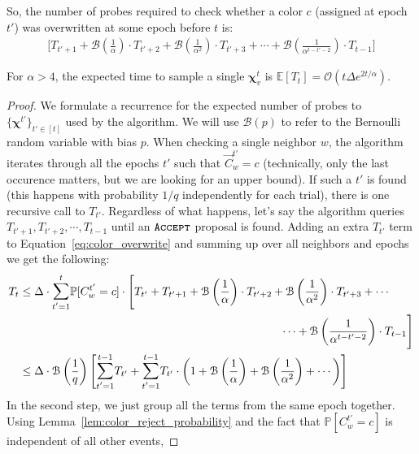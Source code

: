 So, the number of probes required to check whether a color $c$ (assigned at epoch $t'$) was overwritten at some epoch before $t$ is:
\begin{align}
\label{eq:color_overwrite}
\Biggl[T_{t'+1} + \mathcal B\left(\frac{1}{\alpha}\right)\cdot T_{t'+2}
+ \mathcal B\left(\frac{1}{\alpha^2}\right)\cdot T_{t'+3} + \cdots
+ \mathcal B\left(\frac{1}{\alpha^{t-t'-2}}\right)\cdot T_{t-1} \Biggr]
\end{align}

\begin{lemma}
\label{lem:coloring_recurrence}
For $\alpha>4$, the expected time to sample a single $\bm\chi^t_v$ is $\mathbb E[T_t] = \mathcal{O}\left(t\Delta e^{2t/\alpha}\right)$.
\end{lemma}
\begin{proof}
We formulate a recurrence for the expected number of probes to $\{\bm\chi^{t'}\}_{t'\in[t]}$ used by the algorithm.
We will use $\mathcal B(p)$ to refer to the Bernoulli random variable with bias $p$.
When checking a single neighbor $w$, the algorithm iterates through all the epochs $t'$ such that $\vec C^{t'}_w = c$
(technically, only the last occurence matters, but we are looking for an upper bound).
If such a $t'$ is found (this happens with probability $1/q$ independently for each trial), there is one recursive call to $T_{t'}$.
Regardless of what happens, let's say the algorithm queries $T_{t'+1}, T_{t'+2}, \cdots, T_{t-1}$ until an $\texttt{\textsc{Accept}}$ proposal is found.
Adding an extra $T_{t'}$ term to Equation~\ref{eq:color_overwrite} and summing up over all neighbors and epochs we get the following:
\begin{align}
T_{t} &\le \Delta \cdot \mathlarger\sum\limits_{t'=1}^{t} \mathbb P[C^{t'}_w = c]\cdot
\Biggl[ T_{t'} + T_{t'+1} + \mathcal B\left(\frac{1}{\alpha}\right)\cdot T_{t'+2}
+ \mathcal B\left(\frac{1}{\alpha^2}\right)\cdot T_{t'+3} + \cdots\\
&\hspace{23em}
\cdots + \mathcal B\left(\frac{1}{\alpha^{t-t'-2}}\right)\cdot T_{t-1} \Biggr]\\
&\le \Delta\cdot\mathcal B\left( \frac{1}{q}\right) \Biggl[
\mathlarger\sum\limits_{t'=1}^{t-1} T_{t'} +
\mathlarger\sum\limits_{t'=1}^{t-1} T_{t'}\cdot \left(1 + \mathcal B\left(\frac1\alpha\right) + \mathcal B\left(\frac1{\alpha^2}\right) + \cdots\right)
\Biggr]
\end{align}
In the second step, we just group all the terms from the same epoch together.
Using Lemma~\ref{lem:color_reject_probability} and the fact that $\mathbb P[C^{t'}_w = c]$ is independent of all other events,

\end{proof}
